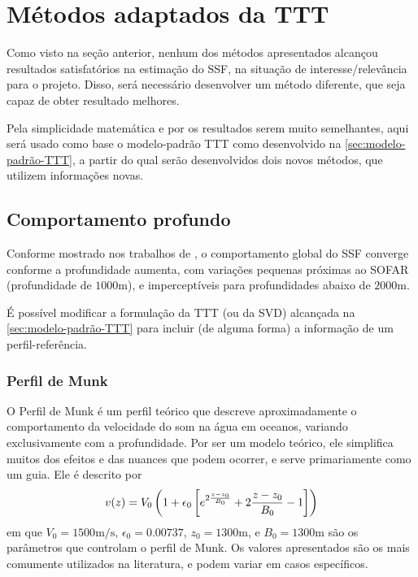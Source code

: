 \section{Métodos adaptados da TTT}
\label{sec:modelos_adaptados_ttt}

Como visto na seção anterior, nenhum dos métodos apresentados alcançou resultados satisfatórios na estimação do SSF, na situação de interesse/relevância para o projeto. Disso, será necessário desenvolver um método diferente, que seja capaz de obter resultado melhores.

Pela simplicidade matemática e por os resultados serem muito semelhantes, aqui será usado como base o modelo-padrão TTT como desenvolvido na \cref{sec:modelo-padrão-TTT}, a partir do qual serão desenvolvidos dois novos métodos, que utilizem informações  novas.

\subsection{Comportamento profundo}
Conforme mostrado nos trabalhos de \citet{munk_ocean_1995,possenti_present_2024}, o comportamento global do SSF converge conforme a profundidade aumenta, com variações pequenas próximas ao SOFAR (profundidade de $1000\si{\meter}$), e imperceptíveis para profundidades abaixo de $2000\si{\meter}$.

É possível modificar a formulação da TTT (ou da SVD) alcançada na \cref{sec:modelo-padrão-TTT} para incluir (de alguma forma) a informação de um perfil-referência.

\subsubsection*{Perfil de Munk}

O \gls{Perfil de Munk} \cite{munk_sound_1974} é um perfil teórico que descreve aproximadamente o comportamento da velocidade do som na água em oceanos, variando exclusivamente com a profundidade. Por ser um modelo teórico, ele simplifica muitos dos efeitos e das nuances que podem ocorrer, e serve primariamente como um guia. Ele é descrito por
\begin{equation}
	v(z) = V_0 \pts{ 1 + \epsilon_0 \bts{ e^{2\frac{z-z_0}{B_0} } + 2\frac{z-z_0}{B_0} - 1 } }
	\label{eq:sec4:perfil_de_munk}
\end{equation}
em que $V_0 = 1500\si{\meter/\second}$, $\epsilon_0 = 0.00737$, $z_0 = 1300\si{\meter}$, e $B_0=1300\si{\meter}$ são os parâmetros que controlam o perfil de Munk. Os valores apresentados são os mais comumente utilizados na literatura, e podem variar em casos específicos.


